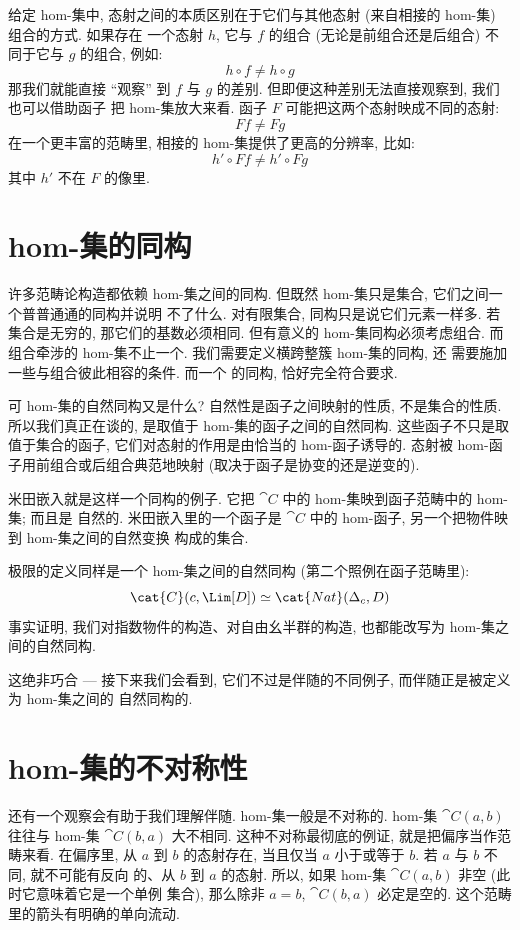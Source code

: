 给定 hom-集中, 态射之间的本质区别在于它们与其他态射 (来自相接的 hom-集) 组合的方式. 如果存在
一个态射 $h$, 它与 $f$ 的组合 (无论是前组合还是后组合) 不同于它与 $g$ 的组合, 例如:
\[h \circ f \neq h \circ g\]
那我们就能直接 ``观察'' 到 $f$ 与 $g$ 的差别. 但即便这种差别无法直接观察到, 我们也可以借助函子
把 hom-集放大来看. 函子 $F$ 可能把这两个态射映成不同的态射:
\[F f \neq F g\]
在一个更丰富的范畴里, 相接的 hom-集提供了更高的分辨率, 比如:
\[h' \circ F f \neq h' \circ F g\]
其中 $h'$ 不在 $F$ 的像里.

\section{hom-集的同构}

许多范畴论构造都依赖 hom-集之间的同构. 但既然 hom-集只是集合, 它们之间一个普普通通的同构并说明
不了什么. 对有限集合, 同构只是说它们元素一样多. 若集合是无穷的, 那它们的基数必须相同. 但有意义的
hom-集同构必须考虑组合. 而组合牵涉的 hom-集不止一个. 我们需要定义横跨整簇 hom-集的同构, 还
需要施加一些与组合彼此相容的条件. 而一个  的同构, 恰好完全符合要求.

可 hom-集的自然同构又是什么? 自然性是函子之间映射的性质, 不是集合的性质. 所以我们真正在谈的,
是取值于 hom-集的函子之间的自然同构. 这些函子不只是取值于集合的函子, 它们对态射的作用是由恰当的
hom-函子诱导的. 态射被 hom-函子用前组合或后组合典范地映射 (取决于函子是协变的还是逆变的).

米田嵌入就是这样一个同构的例子. 它把 $\cat{C}$ 中的 hom-集映到函子范畴中的 hom-集; 而且是
自然的. 米田嵌入里的一个函子是 $\cat{C}$ 中的 hom-函子, 另一个把物件映到 hom-集之间的自然变换
构成的集合.

极限的定义同样是一个 hom-集之间的自然同构 (第二个照例在函子范畴里):
\[\cat{C}(c, \Lim[D]) \simeq \cat{Nat}(\Delta_c, D)\]
事实证明, 我们对指数物件的构造、对自由幺半群的构造, 也都能改写为 hom-集之间的自然同构.

这绝非巧合 --- 接下来我们会看到, 它们不过是伴随的不同例子, 而伴随正是被定义为 hom-集之间的
自然同构的.

\section{hom-集的不对称性}

还有一个观察会有助于我们理解伴随. hom-集一般是不对称的. hom-集 $\cat{C}(a, b)$ 往往与
hom-集 $\cat{C}(b, a)$ 大不相同. 这种不对称最彻底的例证, 就是把偏序当作范畴来看. 在偏序里,
从 $a$ 到 $b$ 的态射存在, 当且仅当 $a$ 小于或等于 $b$. 若 $a$ 与 $b$ 不同, 就不可能有反向
的、从 $b$ 到 $a$ 的态射. 所以, 如果 hom-集 $\cat{C}(a, b)$ 非空 (此时它意味着它是一个单例
集合), 那么除非 $a = b$, $\cat{C}(b, a)$ 必定是空的. 这个范畴里的箭头有明确的单向流动.

